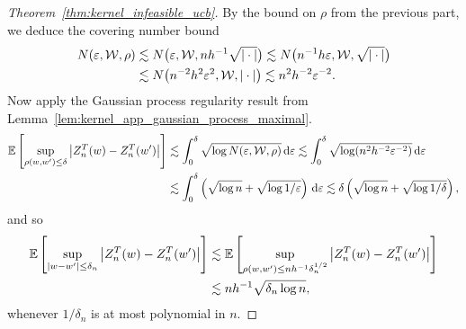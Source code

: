 \begin{proof}[Theorem~\ref{thm:kernel_infeasible_ucb}]
  By the bound on $\rho$ from the previous part,
  we deduce the covering number bound
  \begin{align*}
    N(\varepsilon, \mathcal{W}, \rho)
    &\lesssim
    N\big(
      \varepsilon,
      \mathcal{W},
      n h^{-1} \sqrt{|\cdot|}
    \big)
    \lesssim
    N\big(
      n^{-1} h \varepsilon,
      \mathcal{W},
      \sqrt{|\cdot|}
    \big) \\
    &\lesssim
    N\big(
      n^{-2} h^2 \varepsilon^2,
      \mathcal{W},
      |\cdot|
    \big)
    \lesssim
    n^2 h^{-2} \varepsilon^{-2}.
  \end{align*}
  Now apply the Gaussian process regularity result from
  Lemma~\ref{lem:kernel_app_gaussian_process_maximal}.
  \begin{align*}
    \mathbb{E}\left[
      \sup_{\rho(w,w') \leq \delta}
      \big| Z_n^T(w) - Z_n^T(w') \big|
    \right]
    &\lesssim
    \int_0^{\delta}
    \sqrt{\log N(\varepsilon, \mathcal{W}, \rho)}
    \,\mathrm{d}\varepsilon
    \lesssim
    \int_0^{\delta}
    \sqrt{\log (n^2 h^{-2} \varepsilon^{-2})}
    \,\mathrm{d}\varepsilon \\
    &\lesssim
    \int_0^{\delta}
    \left(
      \sqrt{\log n}
      + \sqrt{\log 1/\varepsilon}
    \right)
    \,\mathrm{d}\varepsilon
    \lesssim
    \delta
    \left(
      \sqrt{\log n}
      + \sqrt{\log 1/\delta}
    \right),
  \end{align*}
  and so
  \begin{align*}
    \mathbb{E}\left[
      \sup_{|w-w'| \leq \delta_n}
      \big| Z_n^T(w) - Z_n^T(w') \big|
    \right]
    &\lesssim
    \mathbb{E}\left[
      \sup_{\rho(w,w') \leq n h^{-1} \delta_n^{1/2}}
      \big| Z_n^T(w) - Z_n^T(w') \big|
    \right] \\
    &\lesssim
    n h^{-1}
    \sqrt{\delta_n \log n},
  \end{align*}
  whenever $1/\delta_n$
  is at most polynomial in $n$.



\end{proof}
